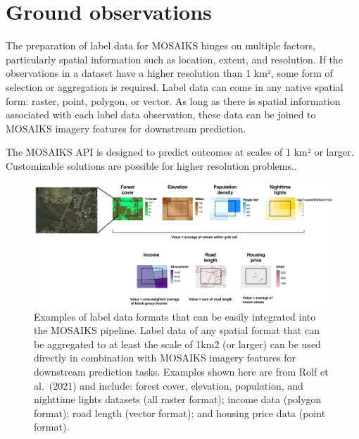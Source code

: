 \documentclass[
  letterpaper,
  DIV=11,
  numbers=noendperiod]{scrreprt}
\begin{document}
\hypertarget{ground-observations}{%
\section*{Ground observations}\label{ground-observations}}


The preparation of label data for MOSAIKS hinges on multiple factors,
particularly spatial information such as location, extent, and
resolution. If the observations in a dataset have a higher resolution
than 1 km², some form of selection or aggregation is required. Label
data can come in any native spatial form: raster, point, polygon, or
vector. As long as there is spatial information associated with each
label data observation, these data can be joined to MOSAIKS imagery
features for downstream prediction.

\begin{tcolorbox}[enhanced jigsaw, bottomtitle=1mm, rightrule=.15mm, coltitle=black, titlerule=0mm, toprule=.15mm, breakable, bottomrule=.15mm, left=2mm, leftrule=.75mm, opacitybacktitle=0.6, colbacktitle=quarto-callout-note-color!10!white, arc=.35mm, opacityback=0, title=\textcolor{quarto-callout-note-color}{\faInfo}\hspace{0.5em}{Note}, toptitle=1mm, colback=white, colframe=quarto-callout-note-color-frame]

The MOSAIKS API is designed to predict outcomes at scales of 1 km² or
larger. Customizable solutions are possible for higher resolution
problems..

\end{tcolorbox}

\begin{figure}

{\centering \includegraphics{images/rolf_et_al_2021-Fig_S4.png}

}

\caption{\label{fig-label-agg}Examples of label data formats that can be
easily integrated into the MOSAIKS pipeline. Label data of any spatial
format that can be aggregated to at least the scale of 1km2 (or larger)
can be used directly in combination with MOSAIKS imagery features for
downstream prediction tasks. Examples shown here are from Rolf et
al.~(2021) and include: forest cover, elevation, population, and
nighttime lights datasets (all raster format); income data (polygon
format); road length (vector format); and housing price data (point
format).}

\end{figure}
\end{document}
